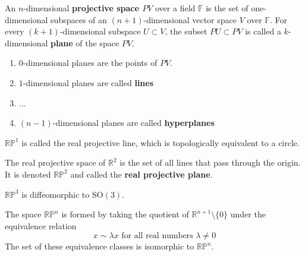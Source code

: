   \begin{definition}
    An $n$-dimensional \textbf{projective space $PV$} over a field $\mathbb{F}$ is the set of one-dimensional subspaces of an $(n+1)$-dimensional vector space $V$ over $\mathbb{F}$. For every $(k+1)$-dimensional subspace $U \subset V$, the subset $PU \subset PV$ is called a $k$-dimensional \textbf{plane} of the space $PV$. 
    \begin{enumerate}
      \item $0$-dimensional planes are the points of $PV$. 
      \item $1$-dimensional planes are called \textbf{lines}
      \item ...
      \item $(n-1)$-dimensional planes are called \textbf{hyperplanes}
    \end{enumerate}
  \end{definition}

  \begin{definition}
    $\mathbb{RP}^1$ is called the real projective line, which is topologically equivalent to a circle. 
  \end{definition}

  \begin{example}
    The real projective space of $\mathbb{R}^2$ is the set of all lines that pass through the origin. It is denoted $\mathbb{R P}^2$ and called the \textbf{real projective plane}. 
  \end{example}

  \begin{example}
    $\mathbb{RP}^3$ is diffeomorphic to SO$(3)$. 
  \end{example}

  \begin{example}
    The space $\mathbb{RP}^n$ is formed by taking the quotient of $\mathbb{R}^{n+1} \setminus \{0\}$ under the equivalence relation 
    \begin{equation}
      x \sim \lambda x \text{ for all real numbers } \lambda \neq 0
    \end{equation}
    The set of these equivalence classes is isomorphic to $\mathbb{RP}^n$. 
  \end{example}


